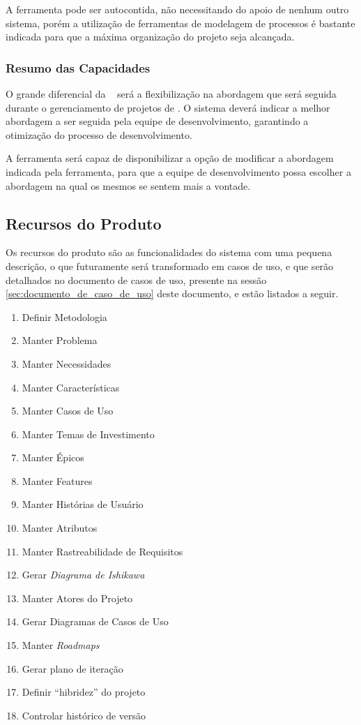 A ferramenta pode ser autocontida, não necessitando do apoio de nenhum outro sistema, porém a utilização de ferramentas de modelagem de processos é bastante indicada para que a máxima organização do projeto seja alcançada.

\subsubsection{Resumo das Capacidades}
	
O grande diferencial da \nomeferramenta~ será a flexibilização na abordagem que será seguida durante o gerenciamento de projetos de \sw. O sistema deverá indicar a melhor abordagem a ser seguida pela equipe de desenvolvimento, garantindo a otimização do processo de desenvolvimento.

A ferramenta será capaz de disponibilizar a opção de modificar a abordagem indicada pela ferramenta, para que a equipe de desenvolvimento possa escolher a abordagem na qual os mesmos se sentem mais a vontade.

\subsection{Recursos do Produto}

Os recursos do produto são as funcionalidades do sistema com uma pequena descrição, o que futuramente será transformado em casos de uso, e que serão detalhados no documento de casos de uso, presente na sessão \ref{sec:documento_de_caso_de_uso} deste documento, e estão listados a seguir.

\begin{enumerate}
	\item Definir Metodologia
	\item Manter Problema
	\item Manter Necessidades
	\item Manter Características
	\item Manter Casos de Uso
	\item Manter Temas de Investimento
	\item Manter Épicos
	\item Manter Features
	\item Manter Histórias de Usuário
	\item Manter Atributos
	\item Manter Rastreabilidade de Requisitos
	\item Gerar \textit{Diagrama de Ishikawa}
	\item Manter Atores do Projeto
	\item Gerar Diagramas de Casos de Uso
	\item Manter \textit{Roadmaps}
	\item Gerar plano de iteração
	\item Definir ``hibridez'' do projeto
	\item Controlar histórico de versão
\end{enumerate}
